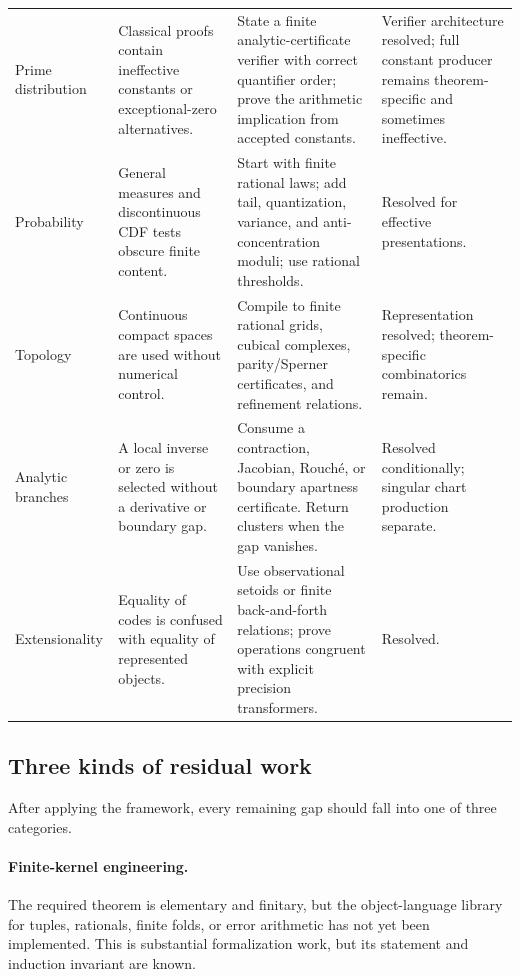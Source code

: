 \begin{longtable}{@{}p{}p{}p{}p{}@{}}
Prime distribution & Classical proofs contain ineffective constants or
exceptional-zero alternatives. & State a finite analytic-certificate verifier
with correct quantifier order; prove the arithmetic implication from accepted
constants. & Verifier architecture resolved; full constant producer remains
theorem-specific and sometimes ineffective.\\
\addlinespace

Probability & General measures and discontinuous CDF tests obscure finite
content. & Start with finite rational laws; add tail, quantization, variance,
and anti-concentration moduli; use rational thresholds. & Resolved for
effective presentations.\\
\addlinespace

Topology & Continuous compact spaces are used without numerical control. &
Compile to finite rational grids, cubical complexes, parity/Sperner
certificates, and refinement relations. & Representation resolved;
theorem-specific combinatorics remain.\\
\addlinespace

Analytic branches & A local inverse or zero is selected without a derivative
or boundary gap. & Consume a contraction, Jacobian, Rouch\'e, or boundary
apartness certificate.  Return clusters when the gap vanishes. & Resolved
conditionally; singular chart production separate.\\
\addlinespace

Extensionality & Equality of codes is confused with equality of represented
objects. & Use observational setoids or finite back-and-forth relations; prove
operations congruent with explicit precision transformers. & Resolved.\\
\bottomrule
\end{longtable}

\subsection{Three kinds of residual work}

After applying the framework, every remaining gap should fall into one of three
categories.

\paragraph{Finite-kernel engineering.}
The required theorem is elementary and finitary, but the object-language
library for tuples, rationals, finite folds, or error arithmetic has not yet
been implemented.  This is substantial formalization work, but its statement
and induction invariant are known.

